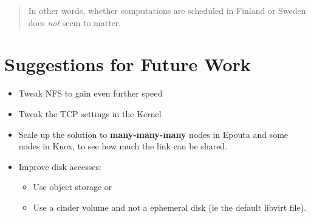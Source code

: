 \begin{quote}
In other words, whether computations are scheduled in Finland or Sweden
does \emph{not} seem to matter.
\end{quote}

\section{Suggestions for Future Work}\label{suggestions-for-future-work}

\begin{itemize}
\item
  Tweak NFS to gain even further speed
\item
  Tweak the TCP settings in the Kernel
\item
  Scale up the solution to \textbf{many-many-many} nodes in Epouta and
  some nodes in Knox, to see how much the link can be shared.
\item
  Improve disk accesses:

  \begin{itemize}
  \item
    Use object storage or
  \item
    Use a cinder volume and not a ephemeral disk (ie the default libvirt
    file).
  \end{itemize}
\end{itemize}

